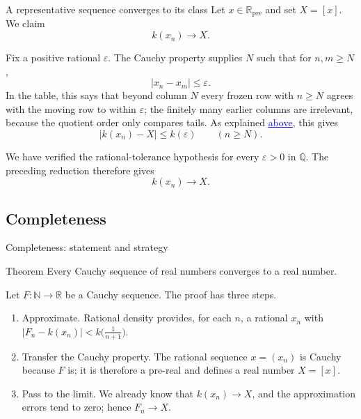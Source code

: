 \documentclass[aspectratio=169,11pt]{beamer}
\newcommand{\N}{\mathbb N}
\newcommand{\Q}{\mathbb Q}
\newcommand{\R}{\mathbb R}
\begin{document}
\begin{frame}{A representative sequence converges to its class}
  \small
  Let \(x\in\R_{\mathrm{pre}}\) and set \(X=[x]\).  We claim
  \[
    k(x_n)\longrightarrow X.
  \]

  Fix a positive rational \(\varepsilon\).  The Cauchy property
  supplies \(N\) such that for \(n,m\ge N\),
  \[
    |x_n-x_m|\le\varepsilon.
  \]
  In the table, this says that beyond column \(N\) every frozen row with
  \(n\ge N\) agrees with the moving row to within \(\varepsilon\); the
  finitely many earlier columns are irrelevant, because the quotient order
  only compares tails.  As explained
  \hyperlink{cauchy-tail-distance}{\textcolor{blue}{\underline{above}}},
  this gives
  \[
    |k(x_n)-X|\le k(\varepsilon)
    \qquad(n\ge N).
  \]

  We have verified the rational-tolerance hypothesis for every
  \(\varepsilon>0\) in \(\Q\).  The preceding reduction therefore gives
  \[
    \boxed{k(x_n)\longrightarrow X.}
  \]
\end{frame}

\subsection{Completeness}

\begin{frame}{Completeness: statement and strategy}
  \begin{block}{Theorem}
    Every Cauchy sequence of real numbers converges to a real number.
  \end{block}

  \medskip
  Let \(F\colon\N\to\R\) be a Cauchy sequence.  The proof has three steps.
  \begin{enumerate}
    \item \alert{Approximate.}  Rational density provides, for each \(n\),
      a rational \(x_n\) with
      \(\bigl|F_n-k(x_n)\bigr|<k\bigl(\tfrac1{n+1}\bigr)\).
    \item \alert{Transfer the Cauchy property.}  The rational sequence
      \(x=(x_n)\) is Cauchy because \(F\) is; it is therefore a pre-real
      and defines a real number \(X=[x]\).
    \item \alert{Pass to the limit.}  We already know that
      \(k(x_n)\to X\), and the approximation errors tend to zero; hence
      \(F_n\to X\).
  \end{enumerate}
\end{frame}
\end{document}
